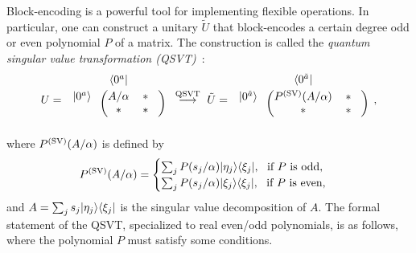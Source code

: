Block-encoding is a powerful tool for implementing flexible operations.
In particular, one can construct a unitary $\tilde{U}$ that block-encodes a certain degree odd or even polynomial $P$ of a matrix.  
The construction is called the \emph{quantum singular value transformation (QSVT)}~\cite{gilyen2019qsvt, Gilyn2019thesis}:
\begin{align}
        U
     = \!\hspace{1mm}
\begin{blockarray}{ccc}
& \bra{0^a} &  & \vspace{1mm}\\
\begin{block}{c(cc)}
  \ket{0^a} \hspace*{1mm} & A/\alpha & \hspace{0mm} * \hspace{3mm}\\
   \hspace*{1mm} & * & \hspace{0mm} * \hspace{3mm}\\
\end{block}
\end{blockarray}
\ \ \overset{\rm QSVT}{\longrightarrow}  \
        \til{U}
     = \!\hspace{1mm}
\begin{blockarray}{ccc}
& \bra{0^{\til{a}}} &  & \vspace{1mm}\\
\begin{block}{c(cc)}
  \ket{0^{\til{a}}} \hspace*{1mm} & P^{(\rm SV)}(A/\alpha) & \hspace{0mm} * \hspace{3mm}\\
   \hspace*{1mm} & * & \hspace{0mm} * \hspace{3mm}\\
\end{block}
\end{blockarray}\!\hspace{2.5mm},
\end{align}
where $P^{(\rm SV)}(A/\alpha)$ is defined by 
\begin{align}
\label{eq:P poly def}
    P^{(\rm SV)}(A/\alpha) =
    \begin{cases}
    \sum_j P(s_j/\alpha)|\eta_j\rangle\langle\xi_j|, \ \  \text{if $P$ is odd,} \\
    \sum_j P(s_j/\alpha)|\xi_j\rangle\langle\xi_j|, \ \ \text{if $P$ is even,}
    \end{cases}
\end{align}
and $A = \sum_j s_j |\eta_j\rangle\langle\xi_j|$ is the singular value decomposition of $A$.
The formal statement of the QSVT, specialized to real even/odd polynomials, is as follows, where the polynomial $P$ must satisfy some conditions.


